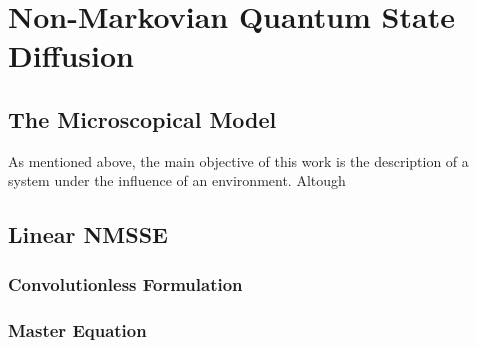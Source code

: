 \chapter{Non-Markovian Quantum State Diffusion}
\label{chap:nmqsd}


\section{The Microscopical Model}
\label{sec:nmqsd.model}

As mentioned above, the main objective of this work is the description of a system under the influence of an environment.
Altough 



\section{Linear NMSSE}
\label{sec:nmqsd.lin_nmsse}


\subsection{Convolutionless Formulation}
\label{sub:nmqsd.lin_nmsse.convolutionless}

\subsection{Master Equation}
\label{sub:nmqsd.lin_nmsse.master}


